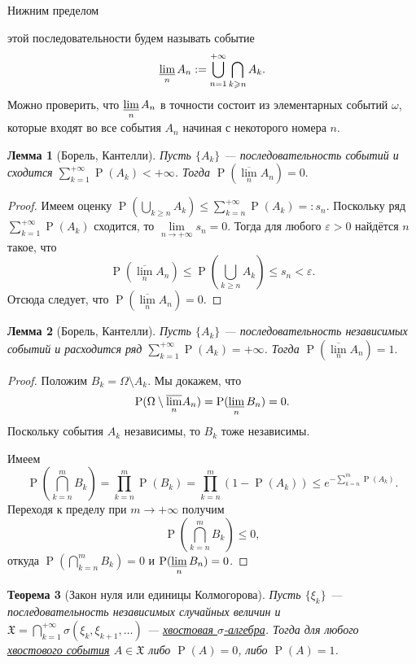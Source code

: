 \documentclass[12pt]{article}
\newtheorem{theorem}{Теорема}
\newtheorem{lemma}[theorem]{Лемма}
\numberwithin{theorem}{section}
\theoremstyle{definition}
\newcommand{\defin}[2]{\hypertarget{#2}{{\color{red} #1}}}
\newcommand{\prob}{\operatorname{P}}
\begin{document}
	\defin{Нижним пределом}{inflim} этой последовательности будем называть событие
	$$ \varliminf\limits_{n} A_n := \bigcup\limits_{n = 1}^{+\infty} \bigcap\limits_{k \geqslant n} A_k. $$
	Можно проверить, что $ \varliminf\limits_{n} A_n $ в точности состоит из элементарных событий $ \omega $,
	которые входят во все события $ A_n $ начиная с некоторого номера $ n $.
	
	\begin{lemma}[Борель, Кантелли]
		Пусть $ \{A_k\} $ --- последовательность событий
		и сходится $ \sum\limits_{k = 1}^{+\infty}\prob (A_k) < +\infty $.
		Тогда $ \prob(\overline{\lim\limits_{n}} A_n) = 0. $
	\end{lemma}
	
	\begin{proof}
		Имеем оценку $ \prob(\bigcup\limits_{k \geqslant n} A_k) \leqslant \sum\limits_{k = n}^{+\infty}\prob (A_k) =: s_n $.
		Поскольку ряд $ \sum\limits_{k = 1}^{+\infty}\prob (A_k) $ сходится, то $ \lim\limits_{n \to +\infty} s_n = 0 $.
		Тогда для любого $ \varepsilon > 0 $ найдётся $ n $ такое, что 
		$$ \prob(\overline{\lim\limits_{n}} A_n)
		\leqslant \prob(\bigcup\limits_{k \geqslant n} A_k) \leqslant s_n < \varepsilon. $$
		Отсюда следует, что $ \prob(\overline{\lim\limits_{n}} A_n) = 0 $.
	\end{proof}
	
	\begin{lemma}[Борель, Кантелли]
		Пусть $ \{A_k\} $ --- последовательность независимых событий
		и расходится ряд $ \sum\limits_{k = 1}^{+\infty}\prob (A_k) = +\infty $.
		Тогда $ \prob(\overline{\lim\limits_{n}} A_n) = 1. $
	\end{lemma}
	
	\begin{proof}
		Положим $ B_k = \Omega \setminus A_k $.
		Мы докажем, что $$ \prob(\Omega \setminus \overline{\lim\limits_{n}} A_n)
		= \prob(\varliminf\limits_{n} B_n) = 0. $$
		Поскольку события $ A_k $ независимы, то $ B_k $ тоже независимы.
		
		Имеем $$ \prob(\bigcap\limits_{k = n}^{m} B_k) = \prod\limits_{k = n}^{m} \prob(B_k) 
		= \prod\limits_{k = n}^{m} (1 - \prob(A_k)) \leqslant e^{-\sum\limits_{k = n}^{m} \prob(A_k)}. $$
		Переходя к пределу при $ m \to +\infty $
		получим 
		$$ \prob(\bigcap\limits_{k = n}^{m} B_k) \leqslant 0, $$
		откуда $ \prob(\bigcap\limits_{k = n}^{m} B_k) = 0 $ и $ \prob(\varliminf\limits_{n} B_n) = 0 $.
	\end{proof}
	
	\begin{theorem}[Закон нуля или единицы Колмогорова] \label{zero one law}
		Пусть $ \{\xi_k\} $ --- последовательность независимых случайных величин
		и $ \mathfrak{X} = \bigcap\limits_{k = 1}^{+\infty} \sigma(\xi_k, \xi_{k + 1}, \ldots) $
		--- \hyperlink{tail-sigma-algebra}{хвостовая $ \sigma $-алгебра}.
		Тогда для любого \hyperlink{tail-event}{хвостового события} $ A \in \mathfrak{X} $ либо $ \prob(A) = 0 $, либо $ \prob(A) = 1 $.
	\end{theorem}
	
\end{document}
